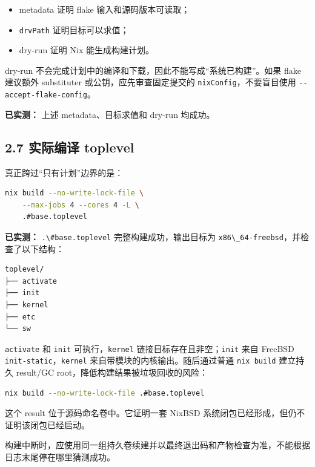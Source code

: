 \documentclass[
  11pt,
  UTF8,
  a4paper,
  fontset=fandol]{ctexart}
\newcommand{\passthrough}[1]{#1}
\providecommand{\tightlist}{%
  \setlength{\itemsep}{0pt}\setlength{\parskip}{0pt}}
\begin{document}
\begin{itemize}
\tightlist
\item
  metadata 证明 flake 输入和源码版本可读取；
\item
  \passthrough{\lstinline!drvPath!} 证明目标可以求值；
\item
  dry-run 证明 Nix 能生成构建计划。
\end{itemize}

dry-run 不会完成计划中的编译和下载，因此不能写成``系统已构建''。如果
flake 建议额外 substituter 或公钥，应先审查固定提交的
\passthrough{\lstinline!nixConfig!}，不要盲目使用
\passthrough{\lstinline!--accept-flake-config!}。

\textbf{已实测：} 上述 metadata、目标求值和 dry-run 均成功。

\subsection{2.7 实际编译
toplevel}\label{ux5b9eux9645ux7f16ux8bd1-toplevel}

真正跨过``只有计划''边界的是：

\begin{lstlisting}[language=sh]
nix build --no-write-lock-file \
    --max-jobs 4 --cores 4 -L \
    .#base.toplevel
\end{lstlisting}

\textbf{已实测：} \passthrough{\lstinline!.\#base.toplevel!}
完整构建成功，输出目标为
\passthrough{\lstinline!x86\_64-freebsd!}，并检查了以下结构：

\begin{lstlisting}
toplevel/
├── activate
├── init
├── kernel
├── etc
└── sw
\end{lstlisting}

\passthrough{\lstinline!activate!} 和 \passthrough{\lstinline!init!}
可执行，\passthrough{\lstinline!kernel!}
链接目标存在且非空；\passthrough{\lstinline!init!} 来自 FreeBSD
\passthrough{\lstinline!init-static!}，\passthrough{\lstinline!kernel!}
来自带模块的内核输出。随后通过普通 \passthrough{\lstinline!nix build!}
建立持久 result/GC root，降低构建结果被垃圾回收的风险：

\begin{lstlisting}[language=sh]
nix build --no-write-lock-file .#base.toplevel
\end{lstlisting}

这个 result 位于源码命名卷中。它证明一套 NixBSD
系统闭包已经形成，但仍不证明该闭包已经启动。

构建中断时，应使用同一组持久卷续建并以最终退出码和产物检查为准，不能根据日志末尾停在哪里猜测成功。
\end{document}
